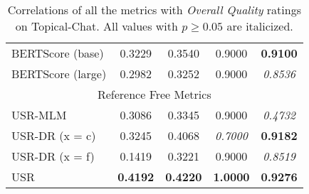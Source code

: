 \documentclass[11pt,a4paper]{article}
\begin{document}
\begin{table*}
\begin{tabular}{|l|c|c|c|c|}
BERTScore (base) & 0.3229 & 0.3540 & 0.9000 & \textbf{0.9100} \\
BERTScore (large) & 0.2982 & 0.3252 & 0.9000 & \textit{0.8536} \\ \hline
\multicolumn{5}{|c|}{Reference Free Metrics} \\ \hline
USR-MLM & 0.3086 & 0.3345 & 0.9000 & \textit{0.4732} \\
USR-DR (x = c) & 0.3245 & 0.4068 & \textit{0.7000} & \textbf{0.9182} \\
USR-DR (x = f) & 0.1419 & 0.3221 & 0.9000 & \textit{0.8519} \\
USR & \textbf{0.4192} & \textbf{0.4220} & \textbf{1.0000} & \textbf{0.9276} \\ \hline
    \end{tabular}
    \caption{Correlations of all the metrics with \textit{Overall Quality} ratings on Topical-Chat. All values with $p \geq 0.05$ are italicized.}
    
\end{table*}
\end{document}
